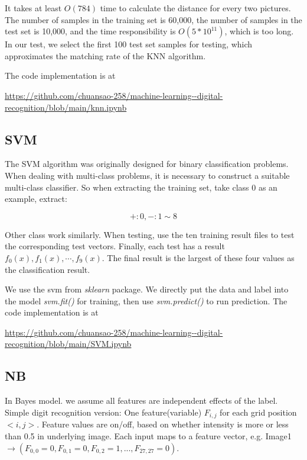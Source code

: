 \documentclass{article}
\begin{document}
	It takes at least $O(784)$ time to calculate the distance for every two pictures. The number of samples in the training set is 60,000, the number of samples in the test set is 10,000, and the time responsibility is $O(5*10^11)$, which is too long. In our test, we select the first 100 test set samples for testing, which approximates the matching rate of the KNN algorithm.
	
	The code implementation is at 
	\begin{center}
		\url{https://github.com/chuansao-258/machine-learning--digital-recognition/blob/main/knn.ipynb}
	\end{center}
	
	\subsection{SVM}
	
	The SVM algorithm was originally designed for binary classification problems. When dealing with multi-class problems, it is necessary to construct a suitable multi-class classifier. So when extracting the training set, take class $0$ as an example, extract:
	
	\begin{equation}
		+: 0, -: 1\sim 8
	\end{equation}

	Other class work similarly. When testing, use the ten training result files to test the corresponding test vectors. Finally, each test has a result $f_0(x), f_1(x), \cdots, f_{9}(x)$. The final result is the largest of these four values as the classification result.
	
	We use the svm from \textit{sklearn} package. We directly put the data and label into the model \textit{svm.fit()} for training, then use \textit{svm.predict()} to run prediction. The code implementation is at
	\begin{center}
		\url{https://github.com/chuansao-258/machine-learning--digital-recognition/blob/main/SVM.ipynb}
	\end{center}
	
	\subsection{NB}
	
	In Bayes model. we assume all features are independent effects of the label. Simple digit recognition version: One feature(variable) $F_{i, j}$ for each grid position $<i,j>$. Feature values are on/off, based on whether intensity is more or less than 0.5 in underlying image. Each input maps to a feature vector, e.g. Image1 $\rightarrow (F_{0, 0} = 0,  F_{0, 1}  = 0,  F_{0, 2}  = 1,..., F_{27, 27}  = 0)$. 
	
\end{document}

